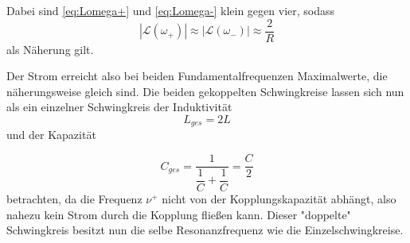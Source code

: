 Dabei sind \eqref{eq:Lomega+} und \eqref{eq:Lomega-} klein gegen vier, sodass
\begin{equation*}
    |\mathcal{L}(ω_+)| \approx |\mathcal{L}(ω_-)| \approx \dfrac{2}{R} 
\end{equation*} als Näherung gilt.

Der Strom erreicht also bei beiden Fundamentalfrequenzen Maximalwerte, die näherungsweise gleich sind. Die beiden gekoppelten Schwingkreise lassen sich nun als ein einzelner Schwingkreis der Induktivität
\begin{equation*}
    L_{ges} = 2 L
\end{equation*} und der Kapazität 

\begin{equation*}
    C_{ges} = \dfrac{1}{\dfrac{1}{C} + \dfrac{1}{C}} = \dfrac{C}{2}
\end{equation*} betrachten, da die Frequenz $ν^+$ nicht von der Kopplungskapazität abhängt, also nahezu kein Strom durch die Kopplung fließen kann.
Dieser "doppelte" Schwingkreis besitzt nun die selbe Resonanzfrequenz wie die Einzelschwingkreise. 

